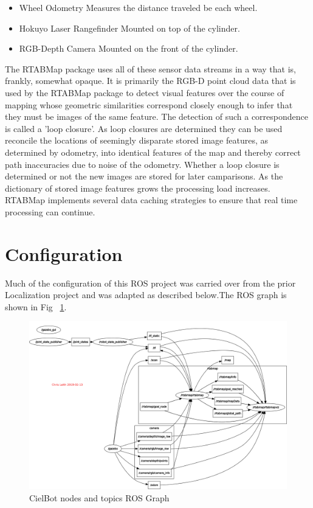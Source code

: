 \documentclass[10pt,journal,compsoc]{IEEEtran}
\begin{document}
\begin{itemize}
 \item Wheel Odometry
 Measures the distance traveled be each wheel.
 \item Hokuyo Laser Rangefinder
 Mounted on top of the cylinder.
 \item RGB-Depth Camera
 Mounted on the front of the cylinder.
\end{itemize}

The RTABMap package uses all of these sensor data streams in a way that is, frankly, somewhat opaque. It is primarily the RGB-D point cloud data that is used by the RTABMap package to detect visual features over the course of mapping whose geometric similarities correspond closely enough to infer that they must be images of the same feature. The detection of such a correspondence is called a 'loop closure'. As loop closures are determined they can be used reconcile the locations of seemingly disparate stored image features, as determined by odometry, into identical features of the map and thereby correct path inaccuracies due to noise of the odometry. Whether a loop closure is determined or not the new images are stored for later camparisons. As the dictionary of stored image features grows the processing load increases. RTABMap implements several data caching strategies to ensure that real time processing can continue.


\section{Configuration}
Much of the configuration of this ROS project was carried over from the prior Localization project and was adapted as described below.The ROS graph is shown in Fig ~\ref{fig:rosgraph}.


\begin{figure}[h]
      \centering
      \includegraphics[width=\linewidth]{Assets/rosgraph_working.png}
      \caption{CielBot nodes and topics ROS Graph}
      \label{fig:rosgraph}
\end{figure}
\end{document}
